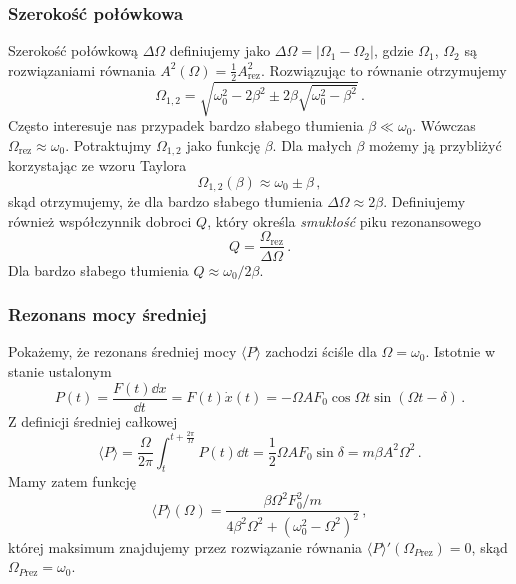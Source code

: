 \documentclass[../main.tex]{subfiles}
\begin{document}
    \subsubsection*{Szerokość połówkowa}
    Szerokość połówkową \(\Delta\Omega\) definiujemy jako \(\Delta\Omega=|\Omega_1-\Omega_2|\), gdzie \(\Omega_1\), \(\Omega_2\) są rozwiązaniami równania \(A^2(\Omega)=\frac{1}{2}A^2_{\text{rez}}\). Rozwiązując to równanie otrzymujemy
    \begin{equation*}
        \Omega_{1,2}=\sqrt{\omega_0^2-2\beta^2\pm2\beta\sqrt{\omega_0^2-\beta^2}}\,.
    \end{equation*}
    Często interesuje nas przypadek bardzo słabego tłumienia \(\beta\ll\omega_0\). Wówczas \(\Omega_\text{rez}\approx \omega_0\). Potraktujmy \(\Omega_{1,2}\) jako funkcję \(\beta\). Dla małych \(\beta\) możemy ją przybliżyć korzystając ze wzoru Taylora
    \begin{equation*}
        \Omega_{1,2}(\beta)\approx\omega_0\pm\beta\,,
    \end{equation*}
    skąd otrzymujemy, że dla bardzo słabego tłumienia \(\Delta \Omega\approx 2\beta\). Definiujemy również współczynnik dobroci \(Q\), który określa \textit{smukłość} piku rezonansowego
    \begin{equation*}
        Q=\frac{\Omega_\text{rez}}{\Delta\Omega}\,.
    \end{equation*}
    Dla bardzo słabego tłumienia \(Q\approx \omega_0/2\beta\).
    \subsubsection*{Rezonans mocy średniej}
    Pokażemy, że rezonans średniej mocy \(\langle P\rangle\) zachodzi ściśle dla \(\Omega=\omega_0\). Istotnie w stanie ustalonym
    \begin{equation*}
        P(t)=\frac{F(t)\dd{x}}{\dd{t}}=F(t)\dot x(t)=-\Omega AF_0\cos\Omega t\sin(\Omega t-\delta)\,.
    \end{equation*}
    Z definicji średniej całkowej 
    \begin{equation*}
        \langle P\rangle=\frac{\Omega}{2\pi}\int_t^{t+\frac{2\pi}{\Omega}}P(t)\dd{t}=\frac{1}{2}\Omega AF_0\sin\delta=m\beta A^2\Omega^2\,.
    \end{equation*}
    Mamy zatem funkcję
    \begin{equation*}
        \langle P\rangle (\Omega)=\frac{\beta\Omega^2F_0^2/m}{4\beta^2\Omega^2+(\omega_0^2-\Omega^2)^2}
\,,    \end{equation*}
której maksimum znajdujemy przez rozwiązanie równania \(\langle P\rangle' (\Omega_{P\text{rez}})=0\), skąd \(\Omega_{P\text{rez}}=\omega_0\).
\end{document}
